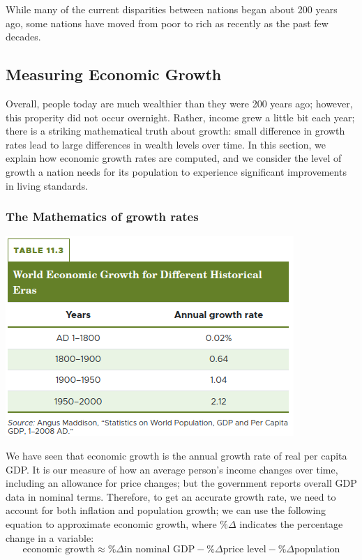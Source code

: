 \documentclass[11pt]{article} %
\theoremstyle{plain}
\theoremstyle{definition}
\begin{document}
While many of the current disparities between nations began about 200 years ago, some nations have moved from poor to rich as recently as the past few decades.

\subsection*{Measuring Economic Growth}

Overall, people today are much wealthier than they were 200 years ago; however, this properity did not occur overnight. Rather, income grew a little bit each year; there is a striking mathematical truth about growth: small difference in growth rates lead to large differences in wealth levels over time.  In this section, we explain how economic growth rates are computed, and we consider the level of growth a nation needs for its population to experience significant improvements in living standards.

\subsubsection*{The Mathematics of growth rates}

\begin{center}
\includegraphics[scale=0.5]{../../images/Chapter 11/table 11.3 .png}
\end{center}

We have seen that economic growth is the annual growth rate of real per capita GDP. It is our measure of how an average person's income changes over time, including an allowance for price changes; but the government reports overall GDP data in nominal terms. Therefore, to get an accurate growth rate, we need to account for both inflation and population growth; we can use the following equation to approximate economic growth, where \(\% \Delta\) indicates the percentage change in a variable:
\begin{equation}
\text{economic growth} \approx \% \Delta \text{in nominal GDP}-\% \Delta \text{price level} - \% \Delta \text{population}
\end{equation}
\end{document}
